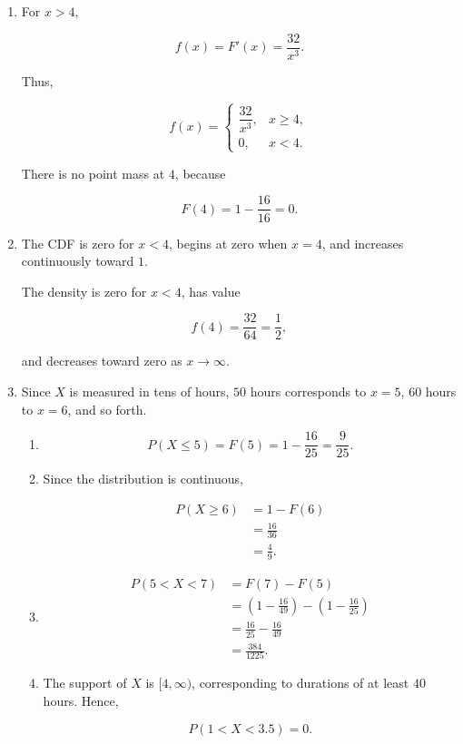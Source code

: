 \documentclass[11pt]{article}
\newenvironment{solution}{
    \par
    \begin{tcolorbox}[
        colback=white,
        colframe=uwgold,
        boxrule=0.7pt,
        arc=2mm,
        left=3mm,
        right=3mm,
        top=2mm,
        bottom=2mm,
        breakable,
        before skip=0.5em,
        after skip=1em,
        title=\textbf{Solution},
        coltitle=uwpurple,
        fonttitle=\bfseries
    ]
}{
    \end{tcolorbox}
}
\begin{document}
\begin{solution}

\begin{enumerate}[label=(\alph*)]

\item For \(x>4\),

\[
f(x)=F'(x)
=
\frac{32}{x^3}.
\]

Thus,

\[
 {
f(x)=
\begin{cases}
\dfrac{32}{x^3}, & x\geq4,\\[2mm]
0, & x<4.
\end{cases}
}
\]

There is no point mass at \(4\), because

\[
F(4)=1-\frac{16}{16}=0.
\]

\item The CDF is zero for \(x<4\), begins at zero when \(x=4\), and
increases continuously toward \(1\).

The density is zero for \(x<4\), has value

\[
f(4)=\frac{32}{64}=\frac12,
\]

and decreases toward zero as \(x\to\infty\).

\item Since \(X\) is measured in tens of hours, \(50\) hours corresponds
to \(x=5\), \(60\) hours to \(x=6\), and so forth.

\begin{enumerate}[label=(\roman*)]

\item

\[
P(X\leq5)
=
F(5)
=
1-\frac{16}{25}
=
 {\frac9{25}}.
\]

\item Since the distribution is continuous,

\begin{align*}
P(X\geq6)
&=
1-F(6)\\
&=
\frac{16}{36}\\
&=
 {\frac49}.
\end{align*}

\item

\begin{align*}
P(5<X<7)
&=
F(7)-F(5)\\
&=
\left(1-\frac{16}{49}\right)
-
\left(1-\frac{16}{25}\right)\\
&=
\frac{16}{25}-\frac{16}{49}\\
&=
 {\frac{384}{1225}}.
\end{align*}

\item The support of \(X\) is \([4,\infty)\), corresponding to durations
of at least \(40\) hours. Hence,

\[
 {P(1<X<3.5)=0}.
\]

\end{enumerate}

\end{enumerate}

\end{solution}
 
\end{document}
